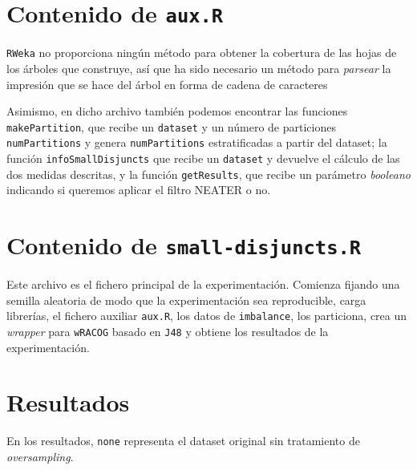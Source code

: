 \section{Contenido de \texttt{aux.R}}
\texttt{RWeka} no proporciona ningún método para obtener la cobertura de las hojas de los árboles que construye, así que
ha sido necesario un método para \textit{parsear} la impresión que se hace del árbol en forma de cadena de caracteres



Asimismo, en dicho archivo también podemos encontrar las funciones \texttt{makePartition}, que recibe un \texttt{dataset}
y un número de particiones \texttt{numPartitions} y genera \texttt{numPartitions} estratificadas a partir del dataset; la
función \texttt{infoSmallDisjuncts} que recibe un \texttt{dataset} y devuelve el cálculo de las dos medidas descritas, y 
la función \texttt{getResults}, que recibe un parámetro \textit{booleano} indicando si queremos aplicar el filtro NEATER
o no.
\clearpage


\section{Contenido de \texttt{small-disjuncts.R}}
Este archivo es el fichero principal de la experimentación. Comienza fijando una semilla aleatoria de modo que la experimentación
sea reproducible, carga librerías, el fichero auxiliar \texttt{aux.R}, los datos de \texttt{imbalance}, los particiona,
crea un \textit{wrapper} para \texttt{wRACOG} basado en \texttt{J48} y obtiene los resultados de la experimentación.

\section{Resultados}
En los resultados, \texttt{none} representa el dataset original sin tratamiento de \textit{oversampling}.
